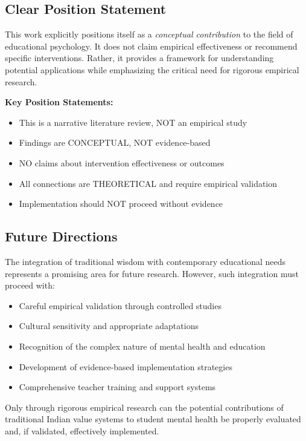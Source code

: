 \documentclass[12pt,a4paper,twocolumn]{article}
\begin{document}
\subsection{Clear Position Statement}

This work explicitly positions itself as a \textit{conceptual contribution} to the field of educational psychology. It does not claim empirical effectiveness or recommend specific interventions. Rather, it provides a framework for understanding potential applications while emphasizing the critical need for rigorous empirical research.

\textbf{Key Position Statements:}
\begin{itemize}
    \item This is a narrative literature review, NOT an empirical study
    \item Findings are CONCEPTUAL, NOT evidence-based
    \item NO claims about intervention effectiveness or outcomes
    \item All connections are THEORETICAL and require empirical validation
    \item Implementation should NOT proceed without evidence
\end{itemize}

\subsection{Future Directions}

The integration of traditional wisdom with contemporary educational needs represents a promising area for future research. However, such integration must proceed with:
\begin{itemize}
    \item Careful empirical validation through controlled studies
    \item Cultural sensitivity and appropriate adaptations
    \item Recognition of the complex nature of mental health and education
    \item Development of evidence-based implementation strategies
    \item Comprehensive teacher training and support systems
\end{itemize}

Only through rigorous empirical research can the potential contributions of traditional Indian value systems to student mental health be properly evaluated and, if validated, effectively implemented.
\end{document}
